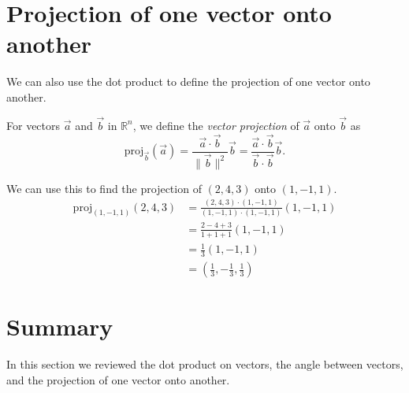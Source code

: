 \documentclass{ximera}
\begin{document}
\section*{Projection of one vector onto another}

We can also use the dot product to define the projection of one vector onto another.

\begin{definition}
For vectors $\vec{a}$ and $\vec{b}$ in $\mathbb{R}^n$, we define the \emph{vector projection} of $\vec{a}$ onto $\vec{b}$ as
\[
\textrm{proj}_{\vec{b}}(\vec{a}) = \frac{\vec{a}\cdot\vec{b}}{\|\vec{b}\|^2}\vec{b}  = \frac{\vec{a}\cdot\vec{b}}{\vec{b}\cdot\vec{b}}\vec{b}.
\]
\end{definition}

\begin{example}
We can use this to find the projection of $(2,4,3)$ onto $(1,-1,1)$.
\begin{align*}
\textrm{proj}_{(1,-1,1)}(2,4,3) &= \frac{(2,4,3)\cdot(1,-1,1)}{(1,-1,1)\cdot(1,-1,1)}(1,-1,1)\\
&= \frac{2-4+3}{1+1+1}(1,-1,1)\\
&= \frac{1}{3}(1,-1,1)\\
&= \left( \frac{1}{3},-\frac{1}{3}, \frac{1}{3}\right)
\end{align*}
\end{example}

\section*{Summary}

In this section we reviewed the dot product on vectors, the angle between vectors, and the projection of one vector onto another.
\end{document}

